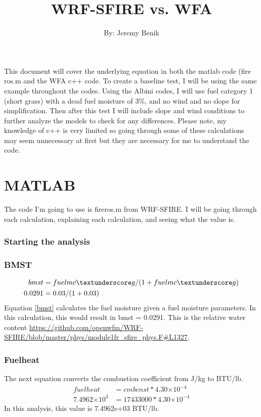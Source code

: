 \documentclass{article}
\newcommand\tenpow[1]{\ensuremath{{\times}10^{#1}}}
\begin{document}
\title{WRF-SFIRE vs. WFA}
\author{By: Jeremy Benik}
\maketitle
	This document will cover the underlying equation in both the matlab code (fire \textunderscore ros.m and the WFA c++ code. To create a baseline test, I will be using the same example throughout the codes. Using the Albini codes, I will use fuel category 1 (short grass) with a dead fuel moisture of 3\%, and no wind and no slope for simplification. Then after this test I will include slope and wind conditions to further analyze the models to check for any differences. Please note, my knowledge of c++ is very limited so going through some of these calculations may seem unnecessary at first but they are necessary for me to understand the code. 
\section{MATLAB}
The code I'm going to use is fire\textunderscore ros.m from WRF-SFIRE. I will be going through each calculation, explaining each calculation, and seeing what the value is.

\subsubsection*{Starting the analysis}
\subsubsection*{BMST}
\begin{equation}
\label{bmst}
\begin{split}
	bmst &= fuelmc \textunderscore g / (1 + fuelmc \textunderscore g) \\
	0.0291 &= 0.03 / (1 + 0.03)
\end{split}
\end{equation}
Equation \ref{bmst} calculates the fuel moisture given a fuel moisture parameters. In this calculation, this would result in bmst = 0.0291. This is the relative water content \url{https://github.com/openwfm/WRF-SFIRE/blob/master/phys/module1fr_sfire_phys.F#L1327}.
\\
\subsubsection*{Fuelheat}
\noindent The next equation converts the combustion coefficient from J/kg to BTU/lb.
\begin{equation}
	\label{fuelheat}
	\begin{split}
		fuelheat &= cmbcnst * 4.30\tenpow{-4} \\
		7.4962 \tenpow{3} &= 17433000 * 4.30\tenpow{-4}
	\end{split}
\end{equation}
	In this analysis, this value is 7.4962e+03 BTU/lb. 
\end{document}
